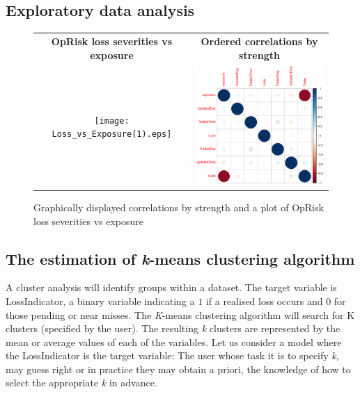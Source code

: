 \documentclass[a4paper]{article}
\begin{document}
\subsection{Exploratory data analysis}

\begin{figure}
\begin{frame}
      \centering
       \begin{tabular}{cc}
        \textbf{OpRisk loss severities vs exposure} & \textbf{Ordered correlations by strength} \\
        \texttt{[image: Loss\_vs\_Exposure(1).eps]}
         &
         \includegraphics[width=7cm]{CorrPlot.eps}
         \end{tabular}
    \end{frame}
    \caption{Graphically displayed correlations by strength and a plot of OpRisk loss severities vs exposure}
    \label{Fig4}
\end{figure}

\subsection{The estimation of \emph{k}-means clustering algorithm}

A cluster analysis will identify groups within a dataset. The target variable is LossIndicator, a binary variable indicating a $1$ if a realised loss occurs and $0$ for those pending or near misses. The \emph{K}-means clustering algorithm will search for K clusters (specified by the user). The resulting \emph{k} clusters are represented by the mean or average values of each of the variables. Let us consider a model where the LossIndicator is the target variable: The user whose task it is to specify \emph{k}, may guess right or in practice they may obtain a priori, the knowledge of how to select the appropriate \emph{k} in advance.\medskip
\end{document}
